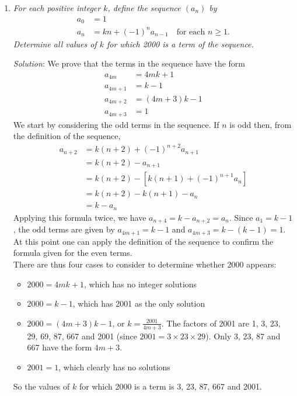 \documentclass{article}
\begin{document}
\begin{enumerate}[1.]
\vfill

\item %
\textit{For each positive integer $k$, define the sequence $(a_{n})$ by
	\begin{align*}
	a_{0} &= 1 \\
	a_{n} &= kn + (-1)^{n}a_{n-1} \quad \text{for each } n \geq 1.
	\end{align*}
	Determine all values of $k$ for which 2000 is a term of the sequence.}

\textit{Solution}:
We prove that the terms in the sequence have the form
\begin{align*}
a_{4m} &= 4mk + 1 \\
a_{4m+1} &= k-1 \\
a_{4m+2} &= (4m + 3)k - 1 \\
a_{4m+3} &= 1
\end{align*}
We start by considering the odd terms in the sequence. If $n$ is odd then, from the definition of the sequence, 
\begin{align*}
a_{n+2} &= k(n + 2) + (-1)^{n+2}a_{n+1}\\
&= k(n + 2) - a_{n+1}\\
&= k(n + 2) - [k(n + 1) + (-1)^{n+1}a_{n}]\\
&= k(n + 2) - k(n + 1) - a_{n}\\
&= k - a_{n}
\end{align*}
Applying this formula twice, we have $a_{n+4} = k - a_{n+2} = a_{n}$. Since $a_{1} = k - 1$, the odd terms are given by $a_{4m+1} = k - 1$ and $a_{4m+3} = k - (k - 1) = 1$. 
At this point one can apply the definition of the sequence to confirm the formula given for the even terms.\\
There are thus four cases to consider to determine whether 2000 appears:
\begin{itemize}
	\item $2000 = 4mk + 1$, which has no integer solutions
	\item $2000 = k - 1$, which has 2001 as the only solution
	\item $2000 = (4m + 3)k - 1$, or $k = \frac{2001}{4m+3}$. The factors of 2001 are 1, 3, 23, 29, 69, 87, 667 and 2001 (since $2001 = 3 \times 23 \times 29$). Only 3, 23, 87 and 667 have the form $4m + 3$.
	\item $ 2001 = 1$, which clearly has no solutions
\end{itemize}
So the values of $k$ for which 2000 is a term is 3, 23, 87, 667 and 2001.


\end{enumerate}
\end{document}

